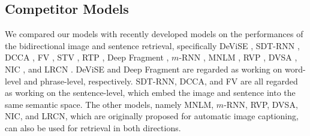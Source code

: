 \documentclass[10pt,twocolumn,letterpaper]{article}
\begin{document}
\subsection{Competitor Models}
\label{sec_competitors}



We {compared} our models with recently developed models on the performances of the bidirectional image and sentence retrieval, specifically DeViSE  \cite{frome_nips2013}, SDT-RNN \cite{socher_tacl2014}, DCCA \cite{yan_cvpr2015}, FV \cite{klein_cvpr2015}, STV \cite{kiros_2015}, RTP \cite{plummer_2015}, Deep Fragment \cite{karpathy_2014}, $m$-RNN \cite{mao_iclr_2015,mao_2014}, MNLM  \cite{kiros_2014}, RVP \cite{chen_2014}, DVSA \cite{karpathy_dvsa_2014}, NIC \cite{vinyals_2014}, and LRCN \cite{donahue_2014}. DeViSE and Deep Fragment are regarded as working on word-level and phrase-level, respectively. SDT-RNN, DCCA, and FV are all regarded as working on the sentence-level, which embed the image and sentence into the same semantic space. The other models, namely MNLM, $m$-RNN, RVP, DVSA, NIC, and LRCN, which are originally proposed for automatic image captioning,
can also be used for retrieval in both directions.
\end{document}
